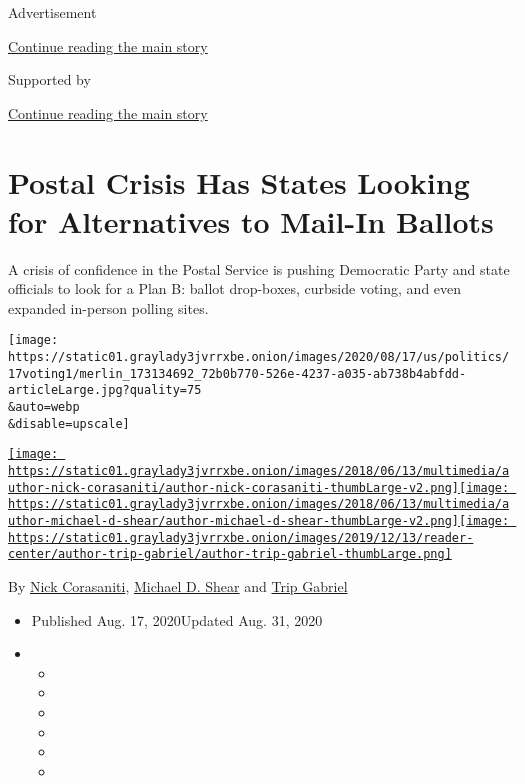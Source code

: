 Advertisement

\protect\hyperlink{after-top}{Continue reading the main story}

Supported by

\protect\hyperlink{after-sponsor}{Continue reading the main story}

\hypertarget{postal-crisis-has-states-looking-for-alternatives-to-mail-in-ballots}{%
\section{Postal Crisis Has States Looking for Alternatives to Mail-In
Ballots}\label{postal-crisis-has-states-looking-for-alternatives-to-mail-in-ballots}}

A crisis of confidence in the Postal Service is pushing Democratic Party
and state officials to look for a Plan B: ballot drop-boxes, curbside
voting, and even expanded in-person polling sites.

\texttt{[image: https://static01.graylady3jvrrxbe.onion/images/2020/08/17/us/politics/17voting1/merlin\_173134692\_72b0b770-526e-4237-a035-ab738b4abfdd-articleLarge.jpg?quality=75\\\&auto=webp\\\&disable=upscale]}

\href{https://www.nytimes3xbfgragh.onion/by/nick-corasaniti}{\texttt{[image: https://static01.graylady3jvrrxbe.onion/images/2018/06/13/multimedia/author-nick-corasaniti/author-nick-corasaniti-thumbLarge-v2.png]}}\href{https://www.nytimes3xbfgragh.onion/by/michael-d-shear}{\texttt{[image: https://static01.graylady3jvrrxbe.onion/images/2018/06/13/multimedia/author-michael-d-shear/author-michael-d-shear-thumbLarge-v2.png]}}\href{https://www.nytimes3xbfgragh.onion/by/trip-gabriel}{\texttt{[image: https://static01.graylady3jvrrxbe.onion/images/2019/12/13/reader-center/author-trip-gabriel/author-trip-gabriel-thumbLarge.png]}}

By \href{https://www.nytimes3xbfgragh.onion/by/nick-corasaniti}{Nick
Corasaniti},
\href{https://www.nytimes3xbfgragh.onion/by/michael-d-shear}{Michael D.
Shear} and
\href{https://www.nytimes3xbfgragh.onion/by/trip-gabriel}{Trip Gabriel}

\begin{itemize}
\item
  Published Aug. 17, 2020Updated Aug. 31, 2020
\item
  \begin{itemize}
  \item
  \item
  \item
  \item
  \item
  \item
  \end{itemize}
\end{itemize}

